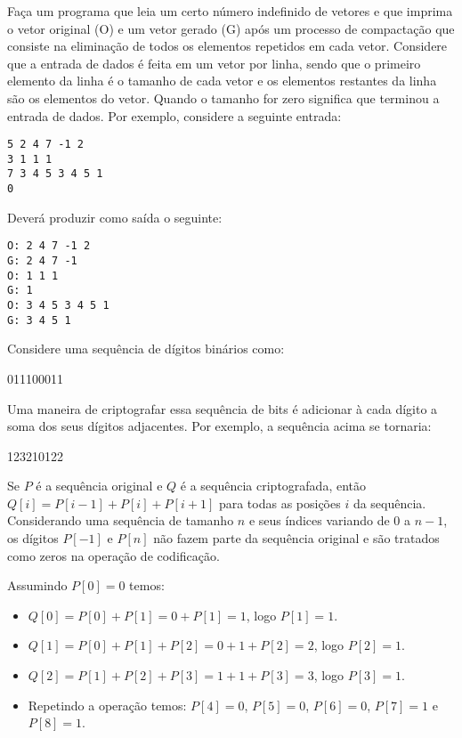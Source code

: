 \item Faça um programa que leia um certo número indefinido de
vetores e que imprima o vetor original (O) e um vetor gerado (G)
após um processo de compactação
que consiste na eliminação de todos os elementos repetidos
em cada vetor. Considere que a entrada de dados é feita em
um vetor por linha, sendo que o primeiro elemento da linha é
o tamanho de cada vetor e os elementos restantes da linha são
os elementos do vetor. Quando o tamanho for zero significa que 
terminou a entrada de dados. Por exemplo, considere a seguinte
entrada:

\begin{verbatim}
5 2 4 7 -1 2
3 1 1 1 
7 3 4 5 3 4 5 1
0
\end{verbatim}

Deverá produzir como saída o seguinte:

\begin{verbatim}
O: 2 4 7 -1 2
G: 2 4 7 -1
O: 1 1 1
G: 1
O: 3 4 5 3 4 5 1
G: 3 4 5 1
\end{verbatim}

\item Considere uma sequência de dígitos binários como:

011100011

Uma maneira de criptografar essa sequência de bits é adicionar
à cada dígito a soma dos seus dígitos adjacentes. Por exemplo,
a sequência acima se tornaria:

123210122

Se $P$ é a sequência original e $Q$ é a sequência criptografada,
então $Q[i] = P[i-1] + P[i] + P[i+1]$ para todas as posições $i$
da sequência. Considerando uma sequência de tamanho $n$ e seus
índices variando de $0$ a $n-1$, os dígitos $P[-1]$ e $P[n]$ não
fazem parte da sequência original e são tratados como zeros na
operação de codificação.

Assumindo $P[0] = 0$ temos:
\begin{itemize}
\item
$Q[0] = P[0] + P[1] = 0 + P[1] = 1$, logo $P[1] = 1$.
\item
$Q[1] = P[0] + P[1] + P[2] = 0 + 1 + P[2] = 2$, logo $P[2] = 1$.
\item
$Q[2] = P[1] + P[2] + P[3] = 1 + 1 + P[3] = 3$, logo $P[3] = 1$.
\item
Repetindo a operação temos: $P[4] = 0$, $P[5] = 0$, $P[6] = 0$, $P[7] = 1$ e $P[8] = 1$.
\end{itemize}

